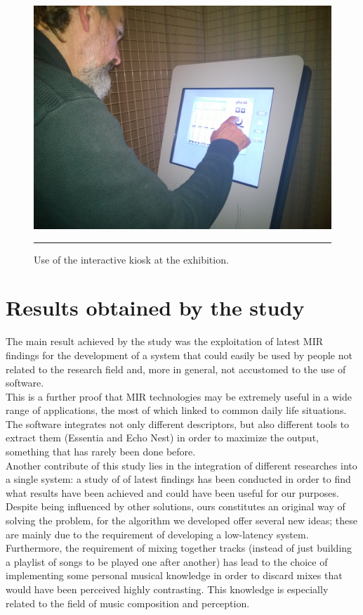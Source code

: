 \begin{figure}[htbp]
\begin{center}
\includegraphics[scale=0.1]{Figures/kiosk2.jpg}
    \rule{20em}{0.5pt}
  \caption[Interactive kiosk at the exhibition]{Use of the interactive kiosk at the exhibition.}
  \label{fig:kiosk}
\end{center}
\end{figure}

\section{Results obtained by the study}
The main result achieved by the study was the exploitation of latest MIR findings for the development of a system that could easily be used by people not related to the research field and, more in general, not accustomed to the use of software. \\
This is a further proof that MIR technologies may be extremely useful in a wide range of applications, the most of which linked to common daily life situations. The software integrates not only different descriptors, but also different tools to extract them (Essentia and Echo Nest) in order to maximize the output, something that has rarely been done before.\\
Another contribute of this study lies in the integration of different researches into a single system: a study of of latest findings has been conducted in order to find what results have been achieved and could have been useful for our purposes. Despite being influenced by other solutions, ours constitutes an original way of solving the problem, for the algorithm we developed offer several new ideas; these are mainly due to the requirement of developing a low-latency system. Furthermore, the requirement of mixing together tracks (instead of just building a playlist of songs to be played one after another) has lead to the choice of implementing some personal musical knowledge in order to discard mixes that would have been perceived highly contrasting. This knowledge is especially related to the field of music composition and perception.\\

